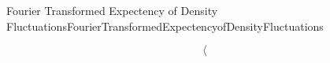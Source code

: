 \begin{mcor}{Fourier Transformed Expectency of Density Fluctuations}{FourierTransformedExpectencyofDensityFluctuations}
    
    \[
        \langle
    \]
    
\end{mcor}